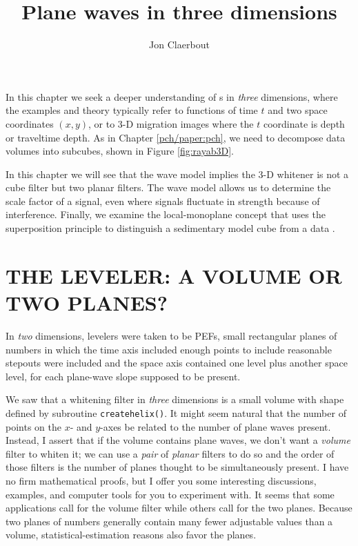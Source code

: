 
\title{Plane waves in three dimensions}
\author{Jon Claerbout}
\label{paper:lmn}
\maketitle

In this chapter we seek a deeper understanding
of s in {\it three} dimensions,
where the examples and theory typically refer to functions
of time $t$ and two space coordinates $(x,y)$,
or to 3-D migration images where the $t$
coordinate is depth or traveltime depth.
As in Chapter \ref{pch/paper:pch},
we need to decompose data volumes into subcubes,
shown in Figure \ref{fig:rayab3D}.

\par
In this chapter we will see that
the wave model implies the 3-D whitener is not a cube filter
but two planar filters.
The wave model allows us to determine
the scale factor of a signal,
even where signals fluctuate in strength because of interference.
Finally, we examine the local-monoplane concept
that uses the superposition principle
to distinguish a sedimentary model cube from a data .

\section{THE LEVELER:  A VOLUME OR TWO PLANES?}
\par
In {\it two} dimensions,
levelers were taken to be PEFs,
small rectangular planes of numbers in which the time axis
included enough points to include reasonable stepouts were included
and the space axis contained one level plus another space level,
for each plane-wave slope supposed to be present.
\par
We saw that a whitening filter in {\it three} dimensions
is a small volume with shape defined by subroutine 
\texttt{createhelix()}.
It might seem natural that the number of points on the $x$-
and $y$-axes be related to the number of plane waves present.
Instead, I assert that if the volume contains plane waves,
we don't want a {\it volume} filter to whiten it;
we can use a {\it pair} of {\it planar} filters to do so
and the order of those filters is the number of planes
thought to be simultaneously present.
I have no firm mathematical proofs,
but I offer you some interesting discussions, examples,
and computer tools for you to experiment with.
It seems that some applications call for the volume filter
while others call for the two planes.
Because two planes of numbers generally contain
many fewer adjustable values than a volume,
statistical-estimation reasons also favor the planes.

